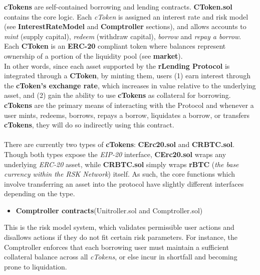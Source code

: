 \documentclass{article}
\begin{document}
\textbf{cTokens} are self-contained borrowing and lending contracts. \textbf{CToken.sol} contains the core logic. Each \textit{cToken} is assigned an interest rate and risk model (see \textbf{InterestRateModel} and \textbf{Comptroller} sections), and allows accounts to \textit{mint} (supply capital), \textit{redeem} (withdraw capital), \textit{borrow} and \textit{repay a borrow}. Each \textbf{CToken} is an \textbf{ERC-20} compliant token where balances represent ownership of a portion of the liquidity pool (see \textbf{market}).
\\
In other words, since each asset supported by the \textbf{rLending Protocol} is integrated through a \textbf{CToken}, by minting them, users (1) earn interest through the \textbf{cToken's exchange rate}, which increases in value relative to the underlying asset, and (2) gain the ability to use \textbf{cTokens} as collateral for borrowing.\\
\textbf{cTokens} are the primary means of interacting with the Protocol and whenever a user mints, redeems, borrows, repays a borrow, liquidates a borrow, or transfers \textbf{cTokens}, they will do so indirectly using this contract. \\
\\
There are currently two types of \textbf{cTokens}: \textbf{CErc20.sol} and \textbf{CRBTC.sol}. Though both types expose the \textit{EIP-20} interface, \textbf{CErc20.sol} wraps any underlying \textit{ERC-20} asset, while \textbf{CRBTC.sol} simply wraps \textbf{rBTC} (\textit{the base currency within the RSK Network}) itself. As such, the core functions which involve transferring an asset into the protocol have slightly different interfaces depending on the type.

\begin{itemize}
\item \textbf{Comptroller contracts}(Unitroller.sol and Comptroller.sol)
\end{itemize}

This is the risk model system, which validates permissible user actions and disallows actions if they do not fit certain risk parameters. For instance, the Comptroller enforces that each borrowing user must maintain a sufficient collateral balance across all \textit{cTokens}, or else incur in shortfall and becoming prone to liquidation.
\\
\end{document}
